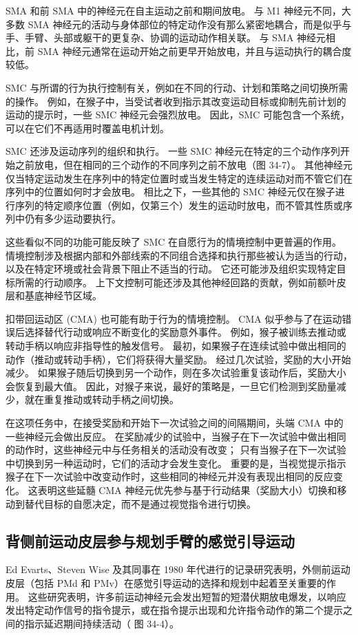 SMA 和前 SMA 中的神经元在自主运动之前和期间放电。 与 M1 神经元不同，大多数 SMA 神经元的活动与身体部位的特定动作没有那么紧密地耦合，而是似乎与手、手臂、头部或躯干的更复杂、协调的运动动作相关联。 与 SMA 神经元相比，前 SMA 神经元通常在运动开始之前更早开始放电，并且与运动执行的耦合度较低。

SMC 与所谓的行为执行控制有关，例如在不同的行动、计划和策略之间切换所需的操作。 例如，在猴子中，当受试者收到指示其改变运动目标或抑制先前计划的运动的提示时，一些 SMC 神经元会强烈放电。 因此，SMC 可能包含一个系统，可以在它们不再适用时覆盖电机计划。

SMC 还涉及运动序列的组织和执行。 一些 SMC 神经元在特定的三个动作序列开始之前放电，但在相同的三个动作的不同序列之前不放电（图 34-7）。 其他神经元仅当特定运动发生在序列中的特定位置时或当发生特定的连续运动对而不管它们在序列中的位置如何时才会放电。 相比之下，一些其他的 SMC 神经元仅在猴子进行序列的特定顺序位置（例如，仅第三个）发生的运动时放电，而不管其性质或序列中仍有多少运动要执行。

这些看似不同的功能可能反映了 SMC 在自愿行为的情境控制中更普遍的作用。 情境控制涉及根据内部和外部线索的不同组合选择和执行那些被认为适当的行动，以及在特定环境或社会背景下阻止不适当的行动。 它还可能涉及组织实现特定目标所需的行动顺序。 上下文控制可能还涉及其他神经回路的贡献，例如前额叶皮层和基底神经节区域。

扣带回运动区 (CMA) 也可能有助于行为的情境控制。 CMA 似乎参与了在运动错误后选择替代行动或响应不断变化的奖励意外事件。 例如，猴子被训练去推动或转动手柄以响应非指导性的触发信号。 最初，如果猴子在连续试验中做出相同的动作（推动或转动手柄），它们将获得大量奖励。 经过几次试验，奖励的大小开始减少。 如果猴子随后切换到另一个动作，则在多次试验重复该动作后，奖励大小会恢复到最大值。 因此，对猴子来说，最好的策略是，一旦它们检测到奖励量减少，就在重复推动或转动手柄之间切换。

在这项任务中，在接受奖励和开始下一次试验之间的间隔期间，头端 CMA 中的一些神经元会做出反应。 在奖励减少的试验中，当猴子在下一次试验中做出相同的动作时，这些神经元中与任务相关的活动没有改变； 只有当猴子在下一次试验中切换到另一种运动时，它们的活动才会发生变化。 重要的是，当视觉提示指示猴子在下一次试验中改变动作时，这些相同的神经元并没有表现出相同的反应变化。 这表明这些延髓 CMA 神经元优先参与基于行动结果（奖励大小）切换和移动到替代目标的自愿决定，而不是通过视觉指令进行切换。


\subsection{背侧前运动皮层参与规划手臂的感觉引导运动}
Ed Evarts、Steven Wise 及其同事在 1980 年代进行的记录研究表明，外侧前运动皮层（包括 PMd 和 PMv）在感觉引导运动的选择和规划中起着至关重要的作用。 这些研究表明，许多前运动神经元会发出短暂的短潜伏期放电爆发，以响应发出特定动作信号的指令提示，或在指令提示出现和允许指令动作的第二个提示之间的指示延迟期间持续活动（ 图 34-4）。


